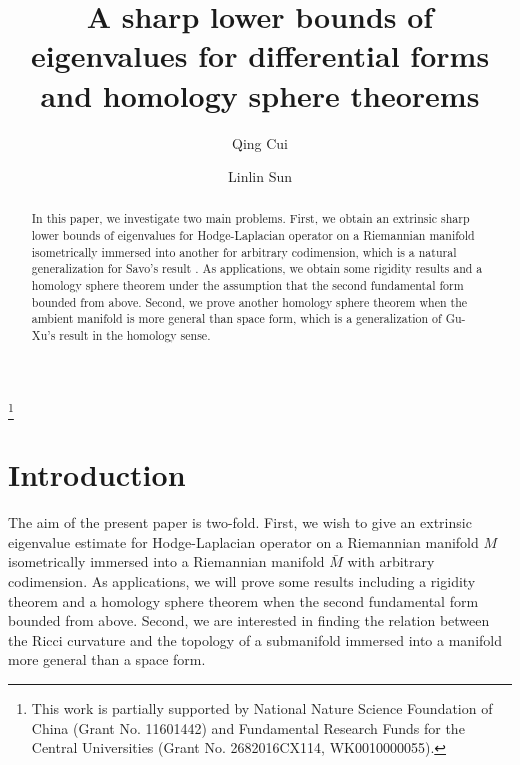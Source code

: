 \documentclass[12pt]{amsart}
\theoremstyle{plain}
\theoremstyle{remark}
\theoremstyle{definition}
\numberwithin{equation}{section}
\begin{document}
\title[lower bounds of eigenvalues]{A sharp lower bounds of eigenvalues for differential forms and  homology sphere theorems}
\thanks{This work is partially supported by National Nature Science Foundation
 of China (Grant No. 11601442) and
Fundamental Research Funds for the Central Universities (Grant No. 2682016CX114, WK0010000055).}

\author{Qing Cui}
\address{School of Mathematics,
Southwest Jiaotong University, 611756
Chengdu, Sichuan, China}

\author{Linlin Sun}
\address{School of Mathematics Sciences,
University of Science and Technology of China,
230026 Hefei, Anhui, China}



\maketitle
\begin{abstract}
In this paper, we investigate two main problems. First, we
obtain an extrinsic sharp lower bounds of eigenvalues for Hodge-Laplacian operator on
a Riemannian manifold isometrically immersed into another for arbitrary
codimension, which is a natural generalization for Savo's result \cite{Sav14}. As applications, we obtain some
rigidity results and a homology sphere theorem under the assumption that the second fundamental form
bounded from above. Second,
we prove another homology sphere theorem when the ambient manifold
is more general than space form, which is a
 generalization of Gu-Xu's result \cite[Theorem 4.1]{XuGu13} in the homology sense.

\end{abstract}\section{Introduction}
The aim of the present paper is two-fold. First, we wish to give an extrinsic eigenvalue estimate
for Hodge-Laplacian operator on a Riemannian manifold $M$ isometrically immersed into a Riemannian
manifold $\bar{M}$ with arbitrary codimension. As applications, we will prove some results including a rigidity theorem
and a homology sphere theorem when the second fundamental form bounded from above.
Second, we are interested in finding the relation between the Ricci curvature and the topology of a submanifold
immersed into a manifold more general than a space form.
\end{document}
